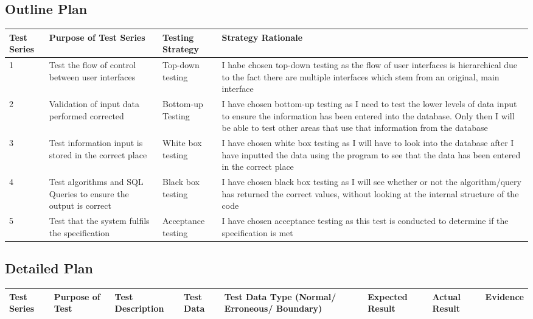 \begin{landscape}
\subsection{Outline Plan}

\begin{center}
    \begin{tabular}{|p{2cm}|p{5cm}|p{5cm}|p{4cm}|}
        \hline
        \textbf{Test Series} & \textbf{Purpose of Test Series} & \textbf{Testing Strategy} & \textbf{Strategy Rationale}\\ \hline
1 & Test the flow of control between user interfaces & Top-down testing & I habe chosen top-down testing as the flow of user interfaces is hierarchical due to the fact there are multiple interfaces which stem from an original, main interface \\ \hline
2 & Validation of input data performed corrected & Bottom-up Testing & I have chosen bottom-up testing as I need to test the lower levels of data input to ensure the information has been entered into the database. Only then I will be able to test other areas that use that information from the database  \\ \hline
3 & Test information input is stored in the correct place & White box testing & I have chosen white box testing as I will have to look into the database after I have inputted the data using the program to see that the data has been entered in the correct place \\ \hline
4 & Test algorithms and SQL Queries to ensure the output is correct & Black box testing & I have chosen black box testing as I will see whether or not the algorithm/query has returned the correct values, without looking at the internal structure of the code \\ \hline
5 & Test that the system fulfils the specification & Acceptance testing & I have chosen acceptance testing as this test is conducted to determine if the specification is met \\ \hline


    \end{tabular}
\end{center}

\subsection{Detailed Plan}

\begin{center}
    \begin{longtable}{|p{1.5cm}|p{2.5cm}|p{2.5cm}|p{2cm}|p{2cm}|p{2cm}|p{2cm}|p{2cm}|}
        \hline
        \textbf{Test Series} & \textbf{Purpose of Test} & \textbf{Test Description} & \textbf{Test Data} & \textbf{Test Data Type (Normal/ Erroneous/ Boundary)} & \textbf{Expected Result} & \textbf{Actual Result} & \textbf{Evidence}\\ \hline


\end{longtable}
\end{center}
\end{landscape}
